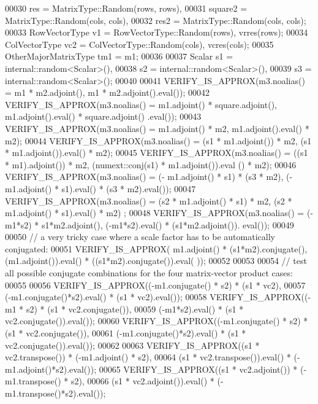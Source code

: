 \begin{DoxyCode}
00030              res = MatrixType::Random(rows, rows),
00031              square2 = MatrixType::Random(cols, cols),
00032              res2 = MatrixType::Random(cols, cols);
00033   RowVectorType v1 = RowVectorType::Random(rows), vrres(rows);
00034   ColVectorType vc2 = ColVectorType::Random(cols), vcres(cols);
00035   OtherMajorMatrixType tm1 = m1;
00036 
00037   Scalar s1 = internal::random<Scalar>(),
00038          s2 = internal::random<Scalar>(),
00039          s3 = internal::random<Scalar>();
00040 
00041   VERIFY\_IS\_APPROX(m3.noalias() = m1 * m2.adjoint(),                 m1 * m2.adjoint().eval());
00042   VERIFY\_IS\_APPROX(m3.noalias() = m1.adjoint() * square.adjoint(),   m1.adjoint().eval() * square.adjoint()
      .eval());
00043   VERIFY\_IS\_APPROX(m3.noalias() = m1.adjoint() * m2,                 m1.adjoint().eval() * m2);
00044   VERIFY\_IS\_APPROX(m3.noalias() = (s1 * m1.adjoint()) * m2,          (s1 * m1.adjoint()).eval() * m2);
00045   VERIFY\_IS\_APPROX(m3.noalias() = ((s1 * m1).adjoint()) * m2,        (numext::conj(s1) * m1.adjoint()).eval
      () * m2);
00046   VERIFY\_IS\_APPROX(m3.noalias() = (- m1.adjoint() * s1) * (s3 * m2), (- m1.adjoint()  * s1).eval() * (s3 * 
      m2).eval());
00047   VERIFY\_IS\_APPROX(m3.noalias() = (s2 * m1.adjoint() * s1) * m2,     (s2 * m1.adjoint()  * s1).eval() * m2)
      ;
00048   VERIFY\_IS\_APPROX(m3.noalias() = (-m1*s2) * s1*m2.adjoint(),        (-m1*s2).eval() * (s1*m2.adjoint()).
      eval());
00049 
00050   \textcolor{comment}{// a very tricky case where a scale factor has to be automatically conjugated:}
00051   VERIFY\_IS\_APPROX( m1.adjoint() * (s1*m2).conjugate(), (m1.adjoint()).eval() * ((s1*m2).conjugate()).eval(
      ));
00052 
00053 
00054   \textcolor{comment}{// test all possible conjugate combinations for the four matrix-vector product cases:}
00055 
00056   VERIFY\_IS\_APPROX((-m1.conjugate() * s2) * (s1 * vc2),
00057                    (-m1.conjugate()*s2).eval() * (s1 * vc2).eval());
00058   VERIFY\_IS\_APPROX((-m1 * s2) * (s1 * vc2.conjugate()),
00059                    (-m1*s2).eval() * (s1 * vc2.conjugate()).eval());
00060   VERIFY\_IS\_APPROX((-m1.conjugate() * s2) * (s1 * vc2.conjugate()),
00061                    (-m1.conjugate()*s2).eval() * (s1 * vc2.conjugate()).eval());
00062 
00063   VERIFY\_IS\_APPROX((s1 * vc2.transpose()) * (-m1.adjoint() * s2),
00064                    (s1 * vc2.transpose()).eval() * (-m1.adjoint()*s2).eval());
00065   VERIFY\_IS\_APPROX((s1 * vc2.adjoint()) * (-m1.transpose() * s2),
00066                    (s1 * vc2.adjoint()).eval() * (-m1.transpose()*s2).eval());

\end{DoxyCode}
